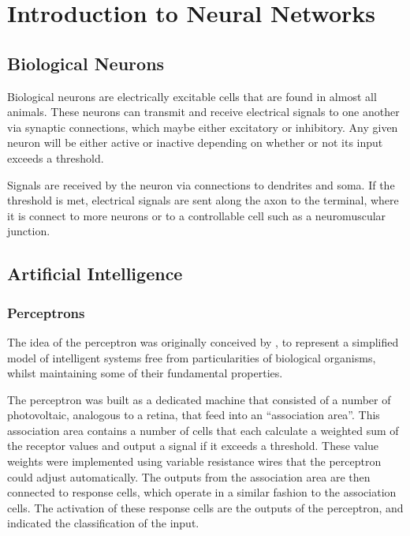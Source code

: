 \chapter{Introduction to Neural Networks}


\section{Biological Neurons}

Biological neurons are electrically excitable cells that are found in almost all
animals.
These neurons can transmit and receive electrical signals to one another via
synaptic connections, which maybe either excitatory or inhibitory.
Any given neuron will be either active or inactive depending on whether or not
its input exceeds a threshold.

\begin{center}
    \vspace{1ex}
    
\end{center}

Signals are received by the neuron via connections to dendrites and soma.
If the threshold is met, electrical signals are sent along the axon to the
terminal, where it is connect to more neurons or to a controllable cell such as
a neuromuscular junction.


\section{Artificial Intelligence}


\subsection{Perceptrons}

The idea of the perceptron was originally conceived by
\cite{Rosenblatt:1958:Perceptron}, to represent a simplified model of
intelligent systems free from particularities of biological organisms, whilst
maintaining some of their fundamental properties.

The perceptron was built as a dedicated machine that consisted of a number of
photovoltaic, analogous to a retina, that feed into an ``association area''.
This association area contains a number of cells that each calculate a weighted
sum of the receptor values and output a signal if it exceeds a threshold.
These value weights were implemented using variable resistance wires that the
perceptron could adjust automatically.
The outputs from the association area are then connected to response cells,
which operate in a similar fashion to the association cells.
The activation of these response cells are the outputs of the perceptron, and
indicated the classification of the input.


